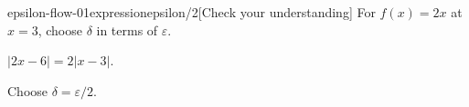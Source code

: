 \begin{bgcheck}{epsilon-flow-01}{expression}{epsilon/2}[Check your understanding]
For \(f(x)=2x\) at \(x=3\), choose \(\delta\) in terms of \(\varepsilon\).
\begin{bghint}
\(|2x-6|=2|x-3|\).
\end{bghint}
\begin{bgreveal}
Choose \(\delta=\varepsilon/2\).
\end{bgreveal}
\end{bgcheck}
